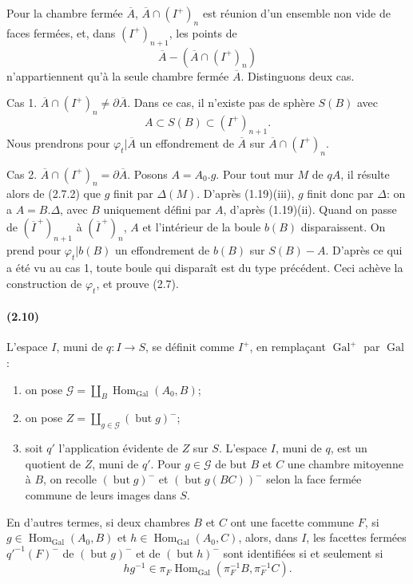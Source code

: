 \documentclass[10pt]{article}
\begin{document}
Pour la chambre fermée \(\overline A\), \(\overline A\cap(I^+)_n\) est réunion d'un ensemble non vide de faces fermées, et, dans \((I^+)_{n+1}\), les points de
\[
\overline A-(\overline A\cap(I^+)_n)
\]
n'appartiennent qu'à la seule chambre fermée \(\overline A\). Distinguons deux cas.

Cas 1. \(\overline A\cap(I^+)_n\ne\partial\overline A\). Dans ce cas, il n'existe pas de sphère \(S(B)\) avec
\[
A\subset S(B)\subset (I^+)_{n+1}.
\]
Nous prendrons pour \(\varphi_t|\overline A\) un effondrement de \(\overline A\) sur \(\overline A\cap(I^+)_n\).

Cas 2. \(\overline A\cap(I^+)_n=\partial\overline A\). Posons \(A=A_0.g\). Pour tout mur \(M\) de \(qA\), il résulte alors de (2.7.2) que \(g\) finit par \(\Delta(M)\). D'après (1.19)(iii), \(g\) finit donc par \(\Delta\): on a \(A=B.\Delta\), avec \(B\) uniquement défini par \(A\), d'après (1.19)(ii). Quand on passe de \((\overline I^{\, +})_{n+1}\) à \((\overline I^{\, +})_n\), \(A\) et l'intérieur de la boule \(b(B)\) disparaissent. On prend pour \(\varphi_t|b(B)\) un effondrement de \(b(B)\) sur \(S(B)-A\). D'après ce qui a été vu au cas 1, toute boule qui disparaît est du type précédent. Ceci achève la construction de \(\varphi_t\), et prouve (2.7).

\paragraph{(2.10)} L'espace \(I\), muni de \(q:I\to S\), se définit comme \(I^+\), en remplaçant \(\operatorname{Gal}^+\) par \(\operatorname{Gal}\):
\begin{enumerate}[label=\alph*)]
\item on pose \(\mathcal G=\coprod_B\operatorname{Hom}_{\operatorname{Gal}}(A_0,B)\);
\item on pose \(Z=\coprod_{g\in\mathcal G}(\operatorname{but}g)^{-}\);
\item soit \(q'\) l'application évidente de \(Z\) sur \(S\). L'espace \(I\), muni de \(q\), est un quotient de \(Z\), muni de \(q'\). Pour \(g\in\mathcal G\) de but \(B\) et \(C\) une chambre mitoyenne à \(B\), on recolle \((\operatorname{but}g)^{-}\) et \((\operatorname{but}g(BC))^{-}\) selon la face fermée commune de leurs images dans \(S\).
\end{enumerate}
En d'autres termes, si deux chambres \(B\) et \(C\) ont une facette commune \(F\), si \(g\in\operatorname{Hom}_{\operatorname{Gal}}(A_0,B)\) et \(h\in\operatorname{Hom}_{\operatorname{Gal}}(A_0,C)\), alors, dans \(I\), les facettes fermées \(q'^{-1}(F)^{-}\) de \((\operatorname{but}g)^{-}\) et de \((\operatorname{but}h)^{-}\) sont identifiées si et seulement si
\[
hg^{-1}\in \pi_F\operatorname{Hom}_{\operatorname{Gal}}(\pi_F^{-1}B,\pi_F^{-1}C).
\]
\end{document}
